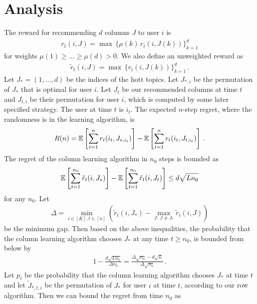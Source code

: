 
\clearpage
\onecolumn
\appendix

\section{Analysis}
\label{sec:analysis}

The reward for recommending $d$ columns $J$ to user $i$ is
\begin{align*}
  r_t(i, J) =
  \max \, \{\mu(k) \, r_t(i, J(k))\}_{k = 1}^d
\end{align*}
for weights $\mu(1) \geq \dots \geq \mu(d) > 0$. We also define an unweighted reward as
\begin{align*}
  \tilde{r}_t(i, J) =
  \max \, \{r_t(i, J(k))\}_{k = 1}^d\,.
\end{align*}
Let $J_\ast = (1, \dots, d)$ be the indices of the hott topics. Let $J_{\ast, i}$ be the permutation of $J_\ast$ that is optimal for user $i$. Let $J_t$ be our recommended columns at time $t$ and $J_{t, i}$ be their permutation for user $i$, which is computed by some later specified strategy. The user at time $t$ is $i_t$. The expected $n$-step regret, where the randomness is in the learning algorithm, is
\begin{align*}
  R(n) =
  \mathbb{E}\left[\sum_{t = 1}^n r_t(i_t, J_{\ast, i_t})\right] - \mathbb{E}\left[\sum_{t = 1}^n r_t(i_t, J_{t, i_t})\right]\,.
\end{align*}
The regret of the column learning algorithm in $n_0$ steps is bounded as
\begin{align*}
  \mathbb{E}\left[\sum_{t = 1}^{n_0} \tilde{r}_t(i, J_\ast)\right] - \mathbb{E}\left[\sum_{t = 1}^{n_0} \tilde{r}_t(i, J_t)\right] \leq
  d \sqrt{L n_0}
\end{align*}
for any $n_0$. Let
\begin{align*}
  \Delta = \min_{i \in [K], t \in [n]} \left(\tilde{r}_t(i, J_\ast) - \max_{J:\, J \neq J_\ast} \tilde{r}_t(i, J)\right)
\end{align*}
be the minimum gap. Then based on the above inequalities, the probability that the column learning algorithm chooses $J_\ast$ at any time $t \geq n_0$, is bounded from below by
\begin{align*}
  1 - \frac{d \sqrt{L n_0}}{\Delta n_0} =
  \frac{\Delta \sqrt{n_0} - d \sqrt{L}}{\Delta \sqrt{n_0}}\,.
  \label{eq:opt lower bound}
\end{align*}
Let $p_t$ be the probability that the column learning algorithm chooses $J_\ast$ at time $t$ and let $\tilde{J}_{\ast, t, i}$ be the permutation of $J_\ast$ for user $i$ at time $t$, according to our row algorithm. Then we can bound the regret from time $n_0$ as
